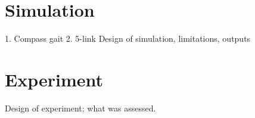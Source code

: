 \section{Simulation}
1. Compass gait
2. 5-link
Design of simulation, limitations, outputs

\section{Experiment}
Design of experiment; what was assessed.